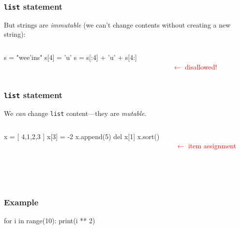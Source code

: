 \documentclass[11pt]{beamer}
\begin{document}
\begin{frame}[fragile]
  \frametitle{\texttt{list} statement}
  \Enlarge

  \begin{itemize}
  \myitem  But strings are \emph{immutable} (we can't change contents without creating a new string):
  \end{itemize}
  \begin{columns}
  \begin{column}{0.6\textwidth}
    \begin{semiverbatim}
s = "wee'ins"
s[4] = 'u'
s = s[:4] + 'u' + s[4:]
    \end{semiverbatim}
  \end{column}
  \begin{column}{0.4\textwidth}
  ~ \\
  \textcolor{red}{$\leftarrow$ disallowed!}
  ~ \\
  \end{column}
  \end{columns}
\end{frame}

\begin{frame}[fragile]
  \frametitle{\texttt{list} statement}
  \Enlarge

  \begin{itemize}
  \myitem  We \emph{can} change \texttt{list} content---they are \emph{mutable}.
  \end{itemize}
  \begin{columns}
  \begin{column}{0.6\textwidth}
    \begin{semiverbatim}
    x = [ 4,1,2,3 ]
    x[3] = -2
    x.append(5)
    del x[1]
    x.sort()
    \end{semiverbatim}
  \end{column}
  \begin{column}{0.4\textwidth}
  ~ \\
  \textcolor{red}{$\leftarrow$ item assignment}
  ~ \\ ~ \\ ~ \\ ~ \\
  \end{column}
  \end{columns}
\end{frame}

\begin{frame}[fragile]
  \frametitle{Example}
  \Enlarge

  \begin{semiverbatim}
for i in range(10):
    print(i ** 2)
  \end{semiverbatim}
\end{frame}
\end{document}

